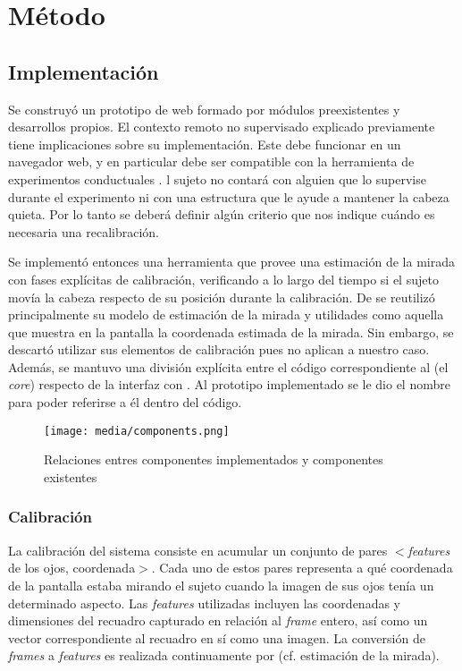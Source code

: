 \section{Método}

\subsection{Implementación}

Se construyó un prototipo de \eyetracker web formado por módulos preexistentes
y desarrollos propios.
El contexto remoto no supervisado explicado previamente tiene implicaciones
sobre su implementación.
Este debe funcionar en un navegador web, y en particular debe ser compatible
con la herramienta de experimentos conductuales \jspsych. 
l sujeto no contará con alguien que lo supervise durante el experimento ni con
una estructura que le ayude a mantener la cabeza quieta.
Por lo tanto se deberá definir algún criterio que nos indique cuándo es
necesaria una recalibración.

Se implementó entonces una herramienta que provee una estimación de la mirada
con fases explícitas de calibración, verificando a lo largo del tiempo si el
sujeto movía la cabeza respecto de su posición durante la calibración.
De \webgazer se reutilizó principalmente su modelo de estimación de la mirada y
utilidades como aquella que muestra en la pantalla la coordenada estimada de la
mirada.
Sin embargo, se descartó utilizar sus elementos de calibración pues no aplican
a nuestro caso.
Además, se mantuvo una división explícita entre el código correspondiente al
\eyetracking (el \textit{core}) respecto de la interfaz con \jspsych.
Al prototipo implementado se le dio el nombre \rastoc para poder referirse a él
dentro del código.

\begin{figure}
    \centering
    \texttt{[image: media/components.png]}
    \caption{Relaciones entres componentes implementados y componentes
    existentes}
    \label{fig:components}
\end{figure}

\subsubsection{Calibración}

La calibración del sistema consiste en acumular un conjunto de pares
$<$\textit{features} de los ojos, coordenada$>$.
Cada uno de estos pares representa a qué coordenada de la pantalla estaba
mirando el sujeto cuando la imagen de sus ojos tenía un determinado aspecto.
Las \textit{features} utilizadas incluyen las coordenadas y dimensiones del
recuadro capturado en relación al \textit{frame} entero, así como un vector
correspondiente al recuadro en sí como una imagen.
La conversión de \textit{frames} a \textit{features} es realizada continuamente
por \webgazer (cf. estimación de la mirada).


